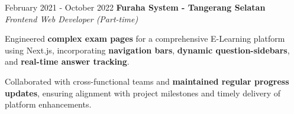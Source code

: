 \documentclass[../main.tex]{subfiles}
\begin{document}
\vspace{0.40 cm}

\begin{twocolentry}{February 2021 - October 2022}
    \textbf{Furaha System \color{Gray}- Tangerang Selatan}\\
    \textit{Frontend Web Developer (Part-time)}
\end{twocolentry}

\vspace{0.10 cm}
\begin{onecolentry}
\begin{highlights}
    \item Engineered \textbf{complex exam pages} for a comprehensive E-Learning platform using Next.js, incorporating \textbf{navigation bars}, \textbf{dynamic question-sidebars}, and \textbf{real-time answer tracking}.
    \item Collaborated with cross-functional teams and \textbf{maintained regular progress updates}, ensuring alignment with project milestones and timely delivery of platform enhancements.
\end{highlights}
\end{onecolentry}
\end{document}
